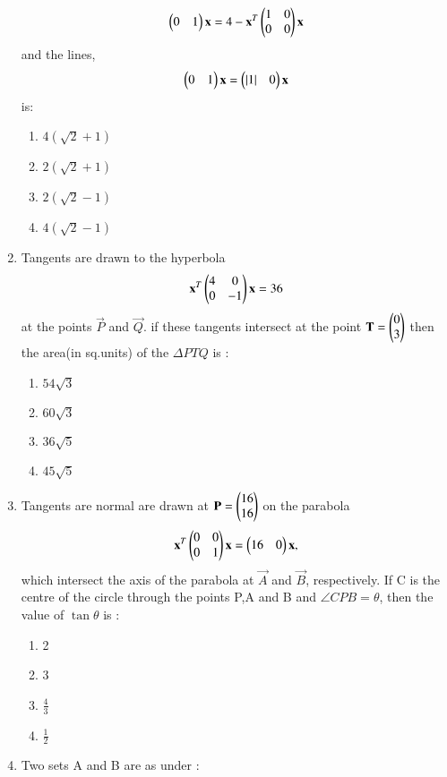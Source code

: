 \begin{enumerate}[label=\arabic*.,ref=\thesubsection.\theenumi]
    \begin{align}
    \begin{pmatrix}0&1\end{pmatrix}\mathbf{x}=4-\mathbf{x}^T\begin{pmatrix}1&0\\0&0\end{pmatrix}\mathbf{x}
    \end{align} and the lines,
    \begin{align}
    \begin{pmatrix}0&1\end{pmatrix}\mathbf{x}=\begin{pmatrix}\left\vert1\right\vert&0\end{pmatrix}\mathbf{x}
    \end{align} is:
    \begin{enumerate}
    \item $4(\sqrt{2}+1)$
    \item $2(\sqrt{2}+1)$
    \item $2(\sqrt{2}-1)$
    \item $4(\sqrt{2}-1)$
    \end{enumerate}
    \item Tangents are drawn to the hyperbola 
    \begin{align}
    \mathbf{x}^T\begin{pmatrix}4&0\\0&-1\end{pmatrix}\mathbf{x}=36
    \end{align} at the points $\vec{P}$ and $\vec{Q}$. if these tangents intersect at the point 
    $\mathbf{T} = \begin{pmatrix}0\\3\end{pmatrix}$ then the area(in sq.units) of the $\Delta PTQ$ is :
    \begin{enumerate}
    \item $54\sqrt{3}$
    \item $60\sqrt{3}$
    \item $36\sqrt{5}$
    \item $45{\sqrt{5}}$
    \end{enumerate}
    \item Tangents are normal are drawn at $\mathbf{P} = \begin{pmatrix}16\\16\end{pmatrix}$ on the parabola
    \begin{align}
    \mathbf{x}^T\begin{pmatrix}0&0\\0&1\end{pmatrix}\mathbf{x}=\begin{pmatrix}16&0\end{pmatrix}\mathbf{x},
    \end{align} which intersect the axis of the parabola at $\vec{A}$ and $\vec{B}$, respectively.
    If C is the centre of the circle through the points P,A and B and
    $\angle CPB=\theta$, then the value of $\tan\theta$ is :
    \begin{enumerate}
    \item 2
    \item 3
    \item $\frac{4}{3}$
    \item $\frac{1}{2}$
    \end{enumerate}
    \item Two sets  A and B are as under :

\end{enumerate}
